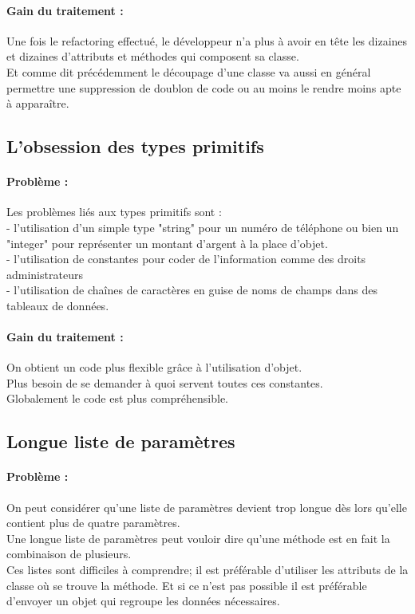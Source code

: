 \documentclass[a4paper,twoside,12pt,openright]{report}
\begin{document}
\paragraph{Gain du traitement :}
Une fois le refactoring effectué, le développeur n'a plus à avoir en tête les dizaines et dizaines d'attributs et méthodes qui composent sa classe.\\
Et comme dit précédemment le découpage d'une classe va aussi en général permettre une suppression de doublon de code ou au moins le rendre moins apte à apparaître.\\

\subsection{L'obsession des types primitifs}
\paragraph{Problème :}
Les problèmes liés aux types primitifs sont :\\
- l'utilisation d'un simple type "string" pour un numéro de téléphone ou bien un "integer" pour représenter un montant d'argent à la place d'objet.\\
- l'utilisation de constantes pour coder de l'information comme des droits administrateurs\\
- l'utilisation de chaînes de caractères en guise de noms de champs dans des tableaux de données.\\

\paragraph{Gain du traitement :}
On obtient un code plus flexible grâce à l'utilisation d'objet.\\
Plus besoin de se demander à quoi servent toutes ces constantes.\\
Globalement le code est plus compréhensible.\\

\subsection{Longue liste de paramètres}
\paragraph{Problème :}
On peut considérer qu'une liste de paramètres devient trop longue dès lors qu'elle contient plus de quatre paramètres.\\
Une longue liste de paramètres peut vouloir dire qu'une méthode est en fait la combinaison de plusieurs.\\
Ces listes sont difficiles à comprendre; il est préférable d'utiliser les attributs de la classe où se trouve la méthode. Et si ce n'est pas possible il est préférable d'envoyer un objet qui regroupe les données nécessaires.\\
\end{document}
